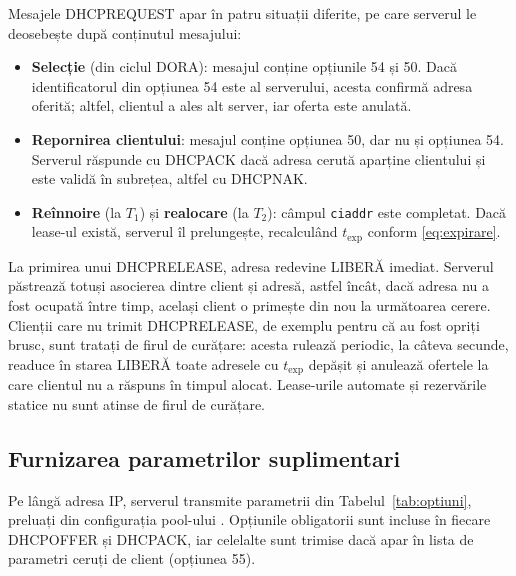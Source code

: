 \documentclass[conference]{IEEEtran}
\begin{document}
Mesajele DHCPREQUEST apar în patru situații diferite, pe care serverul le deosebește după conținutul mesajului:
\begin{itemize}
\item \textbf{Selecție} (din ciclul DORA): mesajul conține opțiunile 54 și 50. Dacă identificatorul din opțiunea 54 este al serverului, acesta confirmă adresa oferită; altfel, clientul a ales alt server, iar oferta este anulată.
\item \textbf{Repornirea clientului}: mesajul conține opțiunea 50, dar nu și opțiunea 54. Serverul răspunde cu DHCPACK dacă adresa cerută aparține clientului și este validă în subrețea, altfel cu DHCPNAK.
\item \textbf{Reînnoire} (la $T_1$) și \textbf{realocare} (la $T_2$): câmpul \texttt{ciaddr} este completat. Dacă lease-ul există, serverul îl prelungește, recalculând $t_{\text{exp}}$ conform \eqref{eq:expirare}.
\end{itemize}

La primirea unui DHCPRELEASE, adresa redevine LIBERĂ imediat. Serverul păstrează totuși asocierea dintre client și adresă, astfel încât, dacă adresa nu a fost ocupată între timp, același client o primește din nou la următoarea cerere. Clienții care nu trimit DHCPRELEASE, de exemplu pentru că au fost opriți brusc, sunt tratați de firul de curățare: acesta rulează periodic, la câteva secunde, readuce în starea LIBERĂ toate adresele cu $t_{\text{exp}}$ depășit și anulează ofertele la care clientul nu a răspuns în timpul alocat. Lease-urile automate și rezervările statice nu sunt atinse de firul de curățare.

\subsection{Furnizarea parametrilor suplimentari}\label{subsec:optiuni}
Pe lângă adresa IP, serverul transmite parametrii din Tabelul~\ref{tab:optiuni}, preluați din configurația pool-ului \cite{rfc2132}. Opțiunile obligatorii sunt incluse în fiecare DHCPOFFER și DHCPACK, iar celelalte sunt trimise dacă apar în lista de parametri ceruți de client (opțiunea 55).
\end{document}
